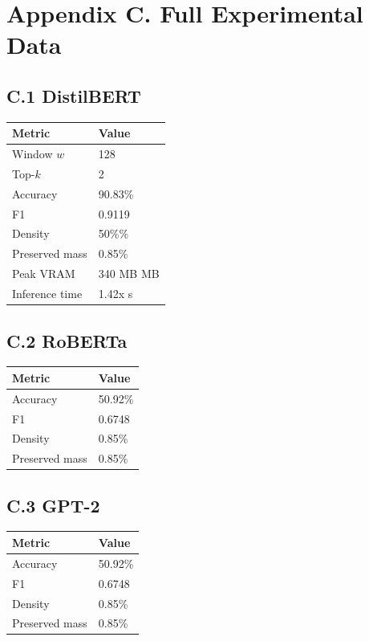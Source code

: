 
\section{Appendix C. Full Experimental Data}

\subsection{C.1 DistilBERT}

\begin{table}[H]
\centering
\small
\begin{tabular}{ll}
\toprule
\textbf{Metric} & \textbf{Value} \\
\midrule
Window $w$ & 128 \\
Top-$k$ & 2 \\
Accuracy & 90.83\% \\
F1 & 0.9119 \\
Density & 50\%\% \\
Preserved mass & 0.85\% \\
Peak VRAM & 340 MB MB \\
Inference time & 1.42x s \\
\bottomrule
\end{tabular}
\end{table}

\subsection{C.2 RoBERTa}

\begin{table}[H]
\centering
\small
\begin{tabular}{ll}
\toprule
\textbf{Metric} & \textbf{Value} \\
\midrule
Accuracy & 50.92\% \\
F1 & 0.6748 \\
Density & 0.85\% \\
Preserved mass & 0.85\% \\
\bottomrule
\end{tabular}
\end{table}

\subsection{C.3 GPT-2}

\begin{table}[H]
\centering
\small
\begin{tabular}{ll}
\toprule
\textbf{Metric} & \textbf{Value} \\
\midrule
Accuracy & 50.92\% \\
F1 & 0.6748 \\
Density & 0.85\% \\
Preserved mass & 0.85\% \\
\bottomrule
\end{tabular}
\end{table}

